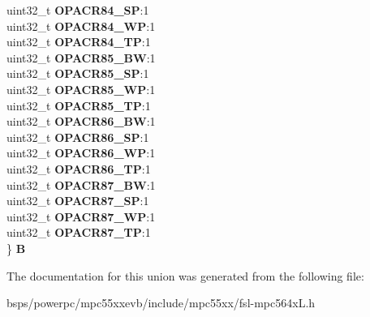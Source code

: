 \begin{DoxyCompactItemize}
\begin{tabbing}
\>uint32\_t {\bfseries OPACR84\_SP}:1\\
\>uint32\_t {\bfseries OPACR84\_WP}:1\\
\>uint32\_t {\bfseries OPACR84\_TP}:1\\
\>uint32\_t {\bfseries OPACR85\_BW}:1\\
\>uint32\_t {\bfseries OPACR85\_SP}:1\\
\>uint32\_t {\bfseries OPACR85\_WP}:1\\
\>uint32\_t {\bfseries OPACR85\_TP}:1\\
\>uint32\_t {\bfseries OPACR86\_BW}:1\\
\>uint32\_t {\bfseries OPACR86\_SP}:1\\
\>uint32\_t {\bfseries OPACR86\_WP}:1\\
\>uint32\_t {\bfseries OPACR86\_TP}:1\\
\>uint32\_t {\bfseries OPACR87\_BW}:1\\
\>uint32\_t {\bfseries OPACR87\_SP}:1\\
\>uint32\_t {\bfseries OPACR87\_WP}:1\\
\>uint32\_t {\bfseries OPACR87\_TP}:1\\
\} {\bfseries B}\\

\end{tabbing}\end{DoxyCompactItemize}


The documentation for this union was generated from the following file\+:\begin{DoxyCompactItemize}
\item 
bsps/powerpc/mpc55xxevb/include/mpc55xx/fsl-\/mpc564x\+L.\+h\end{DoxyCompactItemize}
